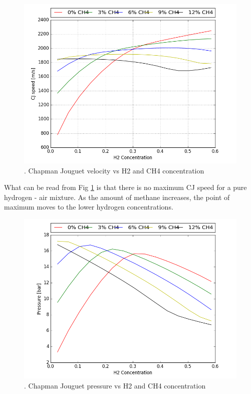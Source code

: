 \documentclass[11pt,a4paper]{article}
\begin{document}
\begin{figure}[t]
    \centering
    \includegraphics[width=1.2\textwidth]{plot_CJ}
    \caption{.         Chapman Jouguet velocity vs H2 and CH4 concentration}
    \label{fig:CJ}
\end{figure}
What can be read from Fig \ref{fig:CJ} is that there is no maximum CJ speed for a pure hydrogen - air mixture. As the amount of methane increases, the point of maximum moves to the lower hydrogen concentrations.
\begin{figure}[t]
    \centering
    \includegraphics[width=1.2\textwidth]{plot_P}
    \caption{.          Chapman Jouguet pressure vs H2 and CH4 concentration}
    \label{fig:P}
\end{figure}
\end{document}
